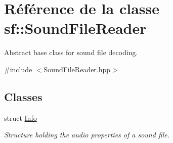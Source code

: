 \hypertarget{classsf_1_1SoundFileReader}{}\section{Référence de la classe sf\+:\+:Sound\+File\+Reader}
\label{classsf_1_1SoundFileReader}


Abstract base class for sound file decoding.  




{\ttfamily \#include $<$Sound\+File\+Reader.\+hpp$>$}

\subsection*{Classes}
\begin{DoxyCompactItemize}
\item 
struct \hyperlink{structsf_1_1SoundFileReader_1_1Info}{Info}
\begin{DoxyCompactList}\small\item\em Structure holding the audio properties of a sound file. \end{DoxyCompactList}\end{DoxyCompactItemize}
